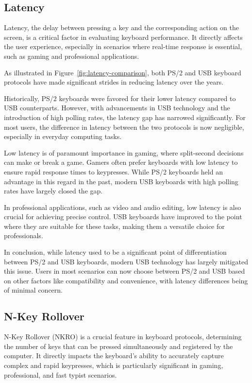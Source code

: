 \subsection{Latency}

Latency, the delay between pressing a key and the corresponding action on the screen, is a critical factor in evaluating keyboard performance. It directly affects the user experience, especially in scenarios where real-time response is essential, such as gaming and professional applications.

As illustrated in Figure~\ref{fig:latency-comparison}, both PS/2 and USB keyboard protocols have made significant strides in reducing latency over the years.

Historically, PS/2 keyboards were favored for their lower latency compared to USB counterparts. However, with advancements in USB technology and the introduction of high polling rates, the latency gap has narrowed significantly. For most users, the difference in latency between the two protocols is now negligible, especially in everyday computing tasks.

Low latency is of paramount importance in gaming, where split-second decisions can make or break a game. Gamers often prefer keyboards with low latency to ensure rapid response times to keypresses. While PS/2 keyboards held an advantage in this regard in the past, modern USB keyboards with high polling rates have largely closed the gap.

In professional applications, such as video and audio editing, low latency is also crucial for achieving precise control. USB keyboards have improved to the point where they are suitable for these tasks, making them a versatile choice for professionals.

In conclusion, while latency used to be a significant point of differentiation between PS/2 and USB keyboards, modern USB technology has largely mitigated this issue. Users in most scenarios can now choose between PS/2 and USB based on other factors like compatibility and convenience, with latency differences being of minimal concern.


\subsection{N-Key Rollover}

N-Key Rollover (NKRO) is a crucial feature in keyboard protocols, determining the number of keys that can be pressed simultaneously and registered by the computer. It directly impacts the keyboard's ability to accurately capture complex and rapid keypresses, which is particularly significant in gaming, professional, and fast typist scenarios.

